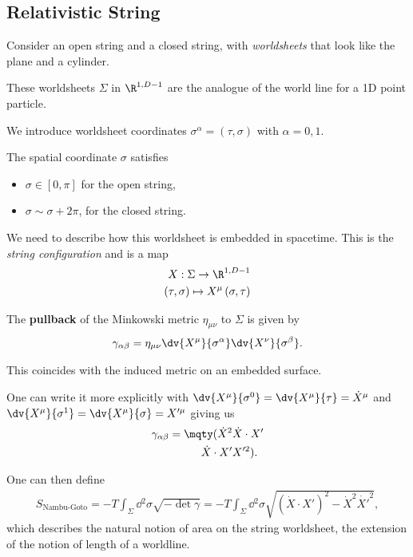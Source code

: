 \subsection{Relativistic String}

Consider an open string and a closed string, with \textit{worldsheets} that look like the plane and a cylinder.


These worldsheets $\Sigma$ in $\R^{1,D-1}$ are the analogue of the world line for a 1D point particle.

We introduce worldsheet coordinates $\sigma^{\alpha} = \left( \tau , \sigma \right)$ with $\alpha = 0,1$. 

The spatial coordinate $\sigma$ satisfies
\begin{itemize}
    \item $\sigma \in \left[ 0,\pi \right] $ for the open string,
    \item $\sigma \sim  \sigma + 2\pi$, for the closed string.
\end{itemize}

We need to describe how this worldsheet is embedded in spacetime. This is the \textit{string configuration} and is a map
\begin{align}
    X : \Sigma \to \R^{1, D - 1} \nonumber \\
    \left( \tau , \sigma \right) \mapsto X^{\mu}\left( \sigma, \tau \right) 
\end{align}

\begin{definition}
    The \textbf{pullback} of the Minkowski metric $\eta_{\mu \nu}$ to $\Sigma$ is given by
\begin{align}
    \gamma_{\alpha \beta} = \eta_{\mu \nu} \dv{X^{\mu}}{\sigma^{\alpha}} \dv{X^{\nu}}{\sigma^{\beta}}
.\end{align}
\end{definition}

This coincides with the induced metric on an embedded surface. 

One can write it more explicitly with $\dv{X^{\mu}}{\sigma^{0}} = \dv{X^{\mu}}{\tau} = \dot{X}^{\mu}$ and $\dv{X^{\mu}}{\sigma^{1}} = \dv{X^{\mu}}{\sigma} = X'^{\mu}$ giving us
\begin{align}
    \gamma_{\alpha \beta} = \mqty( \dot{X}^2 & \dot{X} \cdot X'\\ \dot{X}\cdot X' &  X'^2 )
.\end{align}

One can then define
\begin{align}
    S_\text{Nambu-Goto} = -T \int_{\Sigma} \dd{^2 \sigma} \sqrt{-\det \gamma} = -T \int_\Sigma \dd{^2\sigma} \sqrt{ \left( \dot{X} \cdot X' \right)^2 - \dot{X}^2 \dot{X'}^2} 
,\end{align}
which describes the natural notion of area on the string worldsheet, the extension of the notion of length of a worldline.

